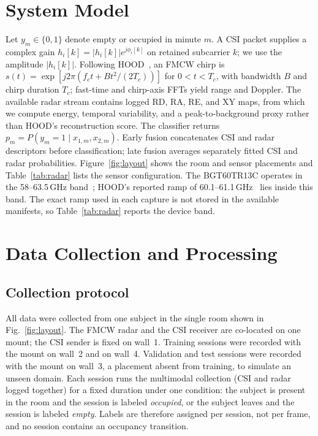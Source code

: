 \documentclass[conference,10pt,letterpaper]{IEEEtran}
\begin{document}
\section{System Model}\label{sec:system}
Let $y_m\in\{0,1\}$ denote empty or occupied in minute $m$. A CSI packet supplies a complex gain $h_i[k]=|h_i[k]|e^{j\phi_i[k]}$ on retained subcarrier $k$; we use the amplitude $|h_i[k]|$. Following HOOD~\cite{hood}, an FMCW chirp is $s(t)=\exp[j2\pi(f_ct+Bt^2/(2T_c))]$ for $0<t<T_c$, with bandwidth $B$ and chirp duration $T_c$; fast-time and chirp-axis FFTs yield range and Doppler. The available radar stream contains logged RD, RA, RE, and XY maps, from which we compute energy, temporal variability, and a peak-to-background proxy rather than HOOD's reconstruction score. The classifier returns $p_m=P(y_m=1\mid x_{1,m},x_{2,m})$. Early fusion concatenates CSI and radar descriptors before classification; late fusion averages separately fitted CSI and radar probabilities. Figure~\ref{fig:layout} shows the room and sensor placements and Table~\ref{tab:radar} lists the sensor configuration. The BGT60TR13C operates in the 58--63.5\,GHz band~\cite{bgt60}; HOOD's reported ramp of 60.1--61.1\,GHz~\cite{hood} lies inside this band. The exact ramp used in each capture is not stored in the available manifests, so Table~\ref{tab:radar} reports the device band.

\section{Data Collection and Processing}\label{sec:data}
\subsection{Collection protocol}
All data were collected from one subject in the single room shown in Fig.~\ref{fig:layout}. The FMCW radar and the CSI receiver are co-located on one mount; the CSI sender is fixed on wall~1. Training sessions were recorded with the mount on wall~2 and on wall~4. Validation and test sessions were recorded with the mount on wall~3, a placement absent from training, to simulate an unseen domain. Each session runs the multimodal collection (CSI and radar logged together) for a fixed duration under one condition: the subject is present in the room and the session is labeled \emph{occupied}, or the subject leaves and the session is labeled \emph{empty}. Labels are therefore assigned per session, not per frame, and no session contains an occupancy transition.
\end{document}
